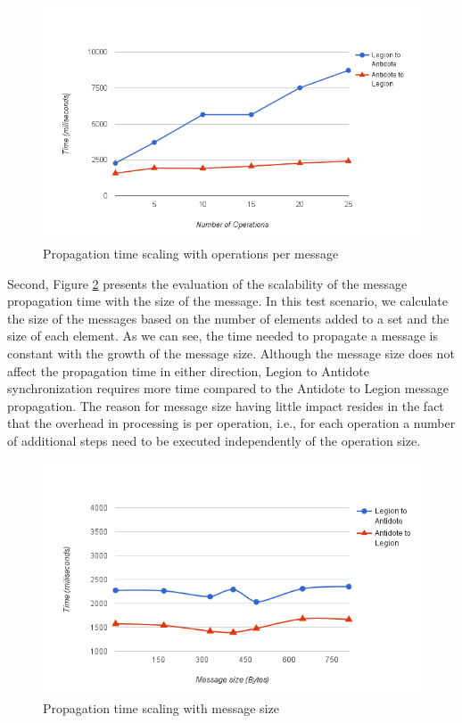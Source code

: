 \begin{figure}[h]
\centering
\includegraphics[scale=0.7]{files/graph1.png}
\caption{Propagation time scaling with operations per message}
\label{graph1}
\end{figure}

Second, Figure \ref{chart2} presents the evaluation of the scalability of the message propagation time with the size of the message. In this test scenario, we calculate the size of the messages based on the number of elements added to a set and the size of each element. As we can see, the time needed to propagate a message is constant with the growth of the message size. Although the message size does not affect the propagation time in either direction, Legion to Antidote synchronization requires more time compared to the Antidote to Legion message propagation. The reason for message size having little impact resides in the fact that the overhead in processing is per operation, i.e., for each operation a number of additional steps need to be executed independently of the operation size.\par

\begin{figure}[H]
\centering
\includegraphics[scale=0.7]{files/chart2.png}
\caption{Propagation time scaling with message size}
\label{chart2}
\end{figure}

